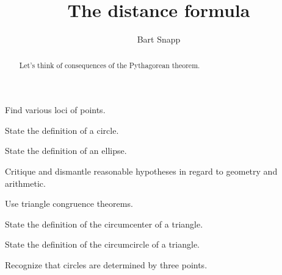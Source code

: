 \documentclass[nooutcomes,noauthor,handout,12pt]{ximera}
\title{The distance formula}
\author{Bart Snapp}
\begin{document}
\begin{abstract}
  Let's think of consequences of the Pythagorean theorem.
\end{abstract}
\maketitle


\begin{listOutcomes}
\item Find various loci of points.
\item State the definition of a circle.
\item State the definition of an ellipse.
\item{Critique and dismantle reasonable hypotheses in regard to geometry and arithmetic.}
\item Use triangle congruence theorems.
\item State the definition of the circumcenter of a triangle.
\item State the definition of the circumcircle of a triangle.
\item Recognize that circles are determined by three points.
\end{listOutcomes}


\mynewpage
\end{document}
